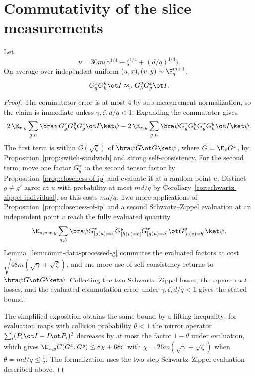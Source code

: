 \section{Commutativity of the slice measurements}
\label{sec:G-commutes}

\begin{theorem}[Commutativity of~$G$]\label{thm:com-main}
	\leanok
	Let
	\[
		\nu=30m\bigl(\gamma^{1/4}+\zeta^{1/4}+(d/q)^{1/4}\bigr).
	\]
	On average over independent uniform $(u,x),(v,y)\sim\F_q^{m+1}$,
	\[
		G^x_gG^y_h\ot I\approx_\nu G^y_hG^x_g\ot I.
	\]
\end{theorem}
\begin{proof}
	\leanok
	The commutator error is at most $4$ by sub-measurement normalization, so
	the claim is immediate unless $\gamma,\zeta,d/q<1$.  Expanding the
	commutator gives
	\[
		2\,\E_{x,y}\sum_{g,h}\bra\psi G^x_gG^y_hG^x_g\ot I\ket\psi
		-2\,\E_{x,y}\sum_{g,h}\bra\psi G^x_gG^y_hG^x_gG^y_h\ot I\ket\psi.
	\]
	The first term is within $O(\sqrt\zeta)$ of $\bra\psi G\ot G\ket\psi$,
	where $G=\E_xG^x$, by Proposition~\ref{prop:switch-sandwich} and strong
	self-consistency.  For the second term, move one factor $G^x_g$ to the
	second tensor factor by Proposition~\ref{prop:closeness-of-ip} and
	evaluate it at a random point $u$.  Distinct $g\ne g'$ agree at $u$ with
	probability at most $md/q$ by
	Corollary~\ref{cor:schwartz-zippel-individual}, so this costs $md/q$.
	Two more applications of Proposition~\ref{prop:closeness-of-ip} and a
	second Schwartz--Zippel evaluation at an independent point $v$ reach the
	fully evaluated quantity
	\[
		\E_{u,v,x,y}\sum_{a,b}\bra\psi
		G^x_{[g(u)=a]}G^y_{[h(v)=b]}G^x_{[g(u)=a]}\ot G^y_{[h(v)=b]}\ket\psi.
	\]
	Lemma~\ref{lem:comm-data-processed-g} commutes the evaluated factors at
	cost $\sqrt{48m(\sqrt\gamma+\sqrt\zeta)}$, and one more use of
	self-consistency returns to $\bra\psi G\ot G\ket\psi$.  Collecting the
	two Schwartz--Zippel losses, the square-root losses, and the evaluated
	commutation error under $\gamma,\zeta,d/q<1$ gives the stated bound.

	The simplified exposition obtains the same bound by a lifting inequality:
	for evaluation maps with collision probability $\theta<1$ the mirror
	operator $\sum_i(P_i\ot I-I\ot P_i)^2$ decreases by at most the factor
	$1-\theta$ under evaluation, which gives
	$\E_{x,y}C(G^x,G^y)\le8\chi+68\zeta$ with
	$\chi=26m(\sqrt\gamma+\sqrt\zeta)$ when $\theta=md/q\le\frac12$.  The
	formalization uses the two-step Schwartz--Zippel evaluation described
	above.
\end{proof}
